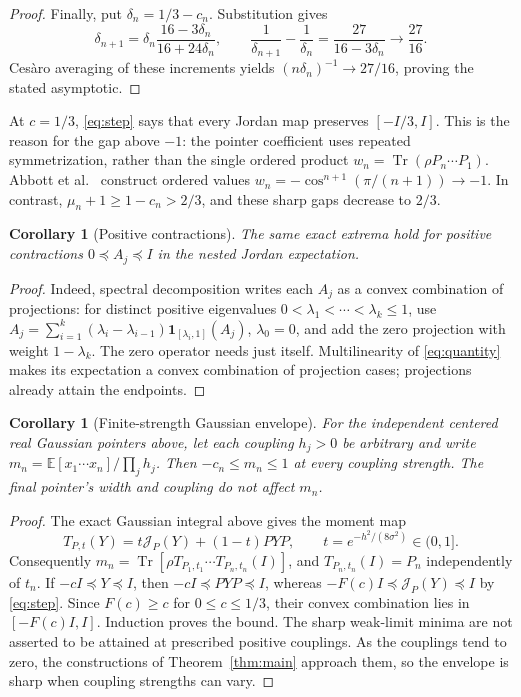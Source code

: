 \documentclass[11pt,a4paper]{article}
\newtheorem{corollary}[theorem]{Corollary}
\newcommand{\Id}{I}
\newcommand{\tr}{\operatorname{Tr}}
\newcommand{\J}{\mathcal J}
\begin{document}
\begin{proof}
Finally, put $\delta_n=1/3-c_n$. Substitution gives
\[
 \delta_{n+1}=\delta_n\frac{16-3\delta_n}{16+24\delta_n},\qquad
 \frac1{\delta_{n+1}}-\frac1{\delta_n}
 =\frac{27}{16-3\delta_n}\longrightarrow\frac{27}{16}.
\]
Ces\`aro averaging of these increments yields
$(n\delta_n)^{-1}\to27/16$, proving the stated asymptotic.
\end{proof}

At $c=1/3$, \eqref{eq:step} says that every Jordan map preserves
$[-\Id/3,\Id]$. This is the reason for the gap above $-1$:
the pointer coefficient uses repeated symmetrization, rather than the
single ordered product $w_n=\tr(\rho P_n\cdots P_1)$.
Abbott et al.\ \cite[equation (25)]{abbott} construct ordered values
$w_n=-\cos^{n+1}(\pi/(n+1))\to-1$. In contrast,
$\mu_n+1\geq1-c_n>2/3$, and these sharp gaps decrease to $2/3$.

\begin{corollary}[Positive contractions]\label{cor:effects}
The same exact extrema hold for positive contractions $0\preceq A_j\preceq\Id$
in the nested Jordan expectation.
\end{corollary}
\begin{proof}
Indeed, spectral decomposition writes each $A_j$ as a convex combination
of projections: for distinct positive eigenvalues
$0<\lambda_1<\cdots<\lambda_k\leq1$, use
$A_j=\sum_{i=1}^k(\lambda_i-\lambda_{i-1})
\mathbf1_{[\lambda_i,1]}(A_j)$, $\lambda_0=0$, and add the zero
projection with weight $1-\lambda_k$. The zero operator needs just itself.
Multilinearity of \eqref{eq:quantity} makes its expectation a convex
combination of projection cases; projections already attain the endpoints.
\end{proof}

\begin{corollary}[Finite-strength Gaussian envelope]\label{cor:gaussian}
For the independent centered real Gaussian pointers above, let each
coupling $h_j>0$ be arbitrary and write
$m_n=\mathbb E[x_1\cdots x_n]/\prod_j h_j$.
Then $-c_n\leq m_n\leq1$ at every coupling strength. The final pointer's
width and coupling do not affect $m_n$.
\end{corollary}
\begin{proof}
The exact Gaussian integral above gives the moment map
\[
 T_{P,t}(Y)=t\J_P(Y)+(1-t)PYP,\qquad
 t=e^{-h^2/(8\sigma^2)}\in(0,1].
\]
Consequently $m_n=\tr[\rho T_{P_1,t_1}\cdots
T_{P_n,t_n}(\Id)]$, and $T_{P_n,t_n}(\Id)=P_n$ independently of $t_n$.
If $-c\Id\preceq Y\preceq\Id$, then
$-c\Id\preceq PYP\preceq\Id$, whereas
$-F(c)\Id\preceq\J_P(Y)\preceq\Id$ by \eqref{eq:step}.
Since $F(c)\geq c$ for $0\leq c\leq1/3$, their convex combination
lies in $[-F(c)\Id,\Id]$. Induction proves the bound.
The sharp weak-limit minima are not asserted to be attained at prescribed
positive couplings. As the couplings tend to zero, the constructions of
Theorem~\ref{thm:main} approach them, so the envelope is sharp when
coupling strengths can vary.
\end{proof}
\end{document}
